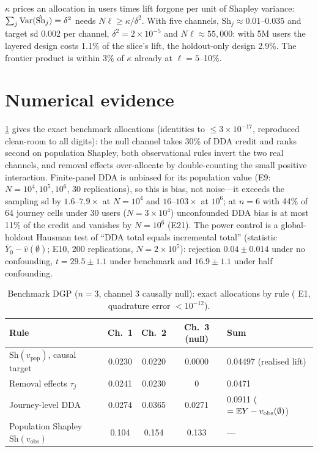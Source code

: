$\kappa$ prices an allocation in users times lift forgone per unit of Shapley variance: $\sum_j \operatorname{Var}(\hat{\mathrm{Sh}}_j) = \delta^2$ needs $N\ell \ge \kappa/\delta^2$. With five channels, $\mathrm{Sh}_j \approx 0.01$--$0.035$ and target sd 0.002 per channel, $\delta^2 = 2\times10^{-5}$ and $N\ell \approx 55{,}000$: with 5M users the layered design costs 1.1\% of the slice's lift, the holdout-only design 2.9\%. The frontier product is within 3\% of $\kappa$ already at $\ell = 5$--10\%.

\section{Numerical evidence}
\label{attr:sec:numerics}

\cref{attr:tab:benchmark} gives the exact benchmark allocations (identities to $\le 3\times10^{-17}$, reproduced clean-room to all digits): the null channel takes 30\% of DDA credit and ranks second on population Shapley, both observational rules invert the two real channels, and removal effects over-allocate by double-counting the small positive interaction. Finite-panel DDA is unbiased for its population value (E9: $N = 10^4, 10^5, 10^6$, 30 replications), so this is bias, not noise---it exceeds the sampling sd by $1.6$--$7.9\times$ at $N = 10^4$ and $16$--$103\times$ at $10^6$; at $n = 6$ with 44\% of 64 journey cells under 30 users ($N = 3\times10^4$) unconfounded DDA bias is at most 11\% of the credit and vanishes by $N = 10^6$ (E21). The power control is a global-holdout Hausman test of ``DDA total equals incremental total'' (statistic $\bar Y_0 - \hat v(\emptyset)$; E10, 200 replications, $N = 2\times10^5$): rejection $0.04 \pm 0.014$ under no confounding, $t = 29.5 \pm 1.1$ under benchmark and $16.9 \pm 1.1$ under half confounding.

\begin{table}[htbp]
\centering\small
\caption{Benchmark DGP ($n = 3$, channel 3 causally null): exact allocations by rule ( E1, quadrature error $< 10^{-12}$).}
\label{attr:tab:benchmark}
\begin{tabular}{lcccl}
\toprule
Rule & Ch.\ 1 & Ch.\ 2 & Ch.\ 3 (null) & Sum \\
\midrule
$\mathrm{Sh}(v_{\mathrm{pop}})$, causal target & 0.0230 & 0.0220 & 0.0000 & 0.04497 (realised lift) \\
Removal effects $\tau_j$ & 0.0241 & 0.0230 & 0 & 0.0471 \\
Journey-level DDA & 0.0274 & 0.0365 & 0.0271 & 0.0911 ($= \mathbb{E} Y - v_{\mathrm{obs}}(\emptyset)$) \\
Population Shapley $\mathrm{Sh}(v_{\mathrm{obs}})$ & 0.104 & 0.154 & 0.133 & --- \\
\bottomrule
\end{tabular}
\end{table}

